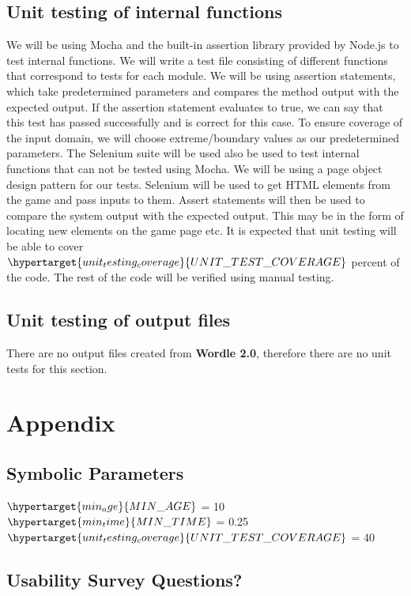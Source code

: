 \documentclass[12pt, titlepage]{article}
\begin{document}
\subsection{Unit testing of internal functions}
We will be using Mocha and the built-in assertion library provided by Node.js 
to 
test internal functions. We will write a test file consisting of different 
functions that correspond to tests for each module. We will be using assertion 
statements, which take predetermined parameters and compares the method output 
with the expected output. If the assertion statement evaluates to true, we can 
say that this test has passed successfully and is correct for this case. To 
ensure coverage of the input domain, we will choose extreme/boundary values as 
our predetermined parameters. The Selenium suite will be used also be used to 
test internal functions that can not be tested using Mocha. We will be using a 
page object design pattern for our tests. Selenium will be used to get HTML 
elements from the game and pass inputs to them. Assert statements will then be 
used to compare the system output with the expected output. This may be in the 
form of locating new elements on the game page etc. It is expected that unit 
testing will be able to cover 
$\hypertarget{unit_testing_coverage}{UNIT\_TEST\_COVERAGE}$ percent of the 
code. The rest of the code will be verified using manual testing.
		
\subsection{Unit testing of output files}		
There are no output files created from \textbf{Wordle 2.0}, 
therefore there are no unit tests for this section.	

\newpage

\section{Appendix}

\subsection{Symbolic Parameters}

$\hypertarget{min_age}{MIN\_AGE}$ = 10\\
$\hypertarget{min_time}{MIN\_TIME}$ = 0.25\\
$\hypertarget{unit_testing_coverage}{UNIT\_TEST\_COVERAGE}$ = 40\\
\subsection{Usability Survey Questions?}
\end{document}
